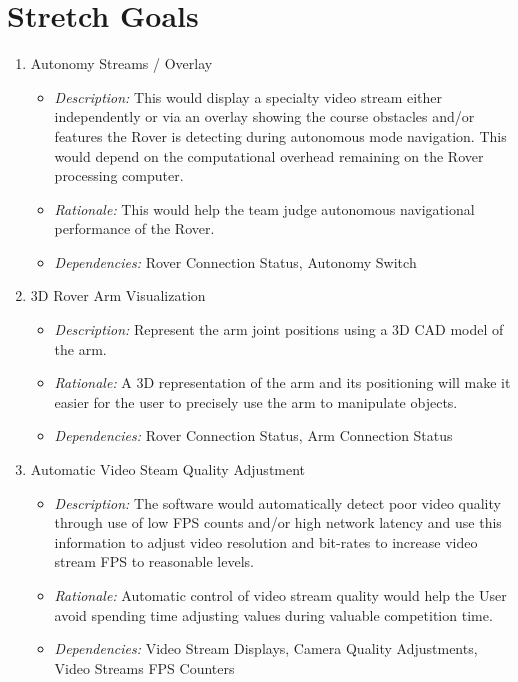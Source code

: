 \documentclass[onecolumn, draftclsnofoot, 10pt, compsoc]{IEEEtran}
\newcommand{\functRequ}[4]{
\item #1%
\par
\begin{itemize}
\item \textit{Description:} #2.%
\item \textit{Rationale:} #3.%
\item \textit{Dependencies:} #4%
\end{itemize}
}
\begin{document}
\section{Stretch Goals}
\begin{enumerate}
\functRequ{Autonomy Streams / Overlay}
{This would display a specialty video stream either independently or via an overlay showing the course obstacles and/or features the Rover is detecting during autonomous mode navigation.
This would depend on the computational overhead remaining on the Rover processing computer}
{This would help the team judge autonomous navigational performance of the Rover}
{Rover Connection Status, Autonomy Switch}

\functRequ{3D Rover Arm Visualization}
{Represent the arm joint positions using a 3D CAD model of the arm}
{A 3D representation of the arm and its positioning will make it easier for the user to precisely use the arm to manipulate objects}
{Rover Connection Status, Arm Connection Status}

\functRequ{Automatic Video Steam Quality Adjustment}
{The software would automatically detect poor video quality through use of low FPS counts and/or high network latency and use this information to adjust video resolution and bit-rates to increase video stream FPS to reasonable levels}
{Automatic control of video stream quality would help the User avoid spending time adjusting values during valuable competition time}
{Video Stream Displays, Camera Quality Adjustments, Video Streams FPS Counters}

\end{enumerate}
\end{document}
